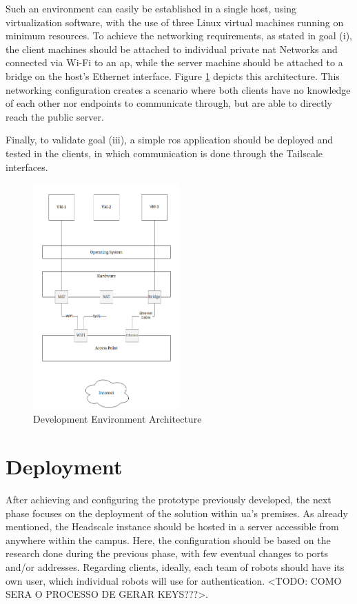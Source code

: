 \documentclass[11pt,twoside,a4paper]{report}
\begin{document}
Such an environment can easily be established in a single host, using virtualization software, with the use of three Linux virtual machines running on minimum resources. To achieve the networking requirements, as stated in goal (i), the client machines should be attached to individual private \ac{nat} Networks and connected via Wi-Fi to an \ac{ap}, while the server machine should be attached to a bridge on the host's Ethernet interface. Figure \ref{fig:sandbox} depicts this architecture. This networking configuration creates a scenario where both clients have no knowledge of each other nor endpoints to communicate through, but are able to directly reach the public server.

Finally, to validate goal (iii), a simple \ac{ros} application should be deployed and tested in the clients, in which communication is done through the Tailscale interfaces.

\begin{figure}[h]
\centering
\includegraphics[width=0.5\textwidth]{dev.png}
\caption{Development Environment Architecture}
\label{fig:sandbox}
\end{figure}


\section{Deployment}

After achieving and configuring the prototype previously developed, the next phase focuses on the deployment of the solution within \ac{ua}'s premises. As already mentioned, the Headscale instance should be hosted in a server accessible from anywhere within the campus. Here, the configuration should be based on the research done during the previous phase, with few eventual changes to ports and/or addresses. Regarding clients, ideally, each team of robots should have its own user, which individual robots will use for authentication. <TODO: COMO SERA O PROCESSO DE GERAR KEYS???>.
\end{document}
